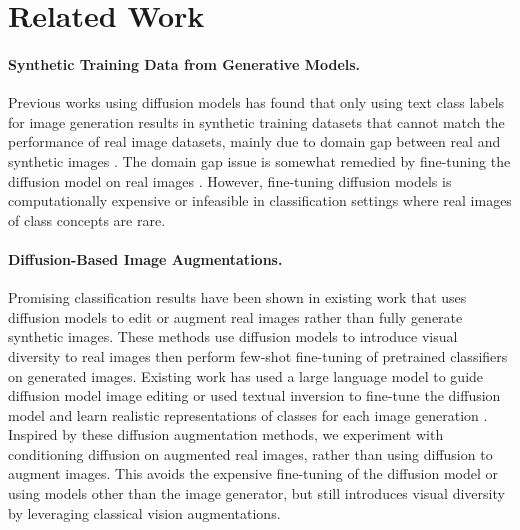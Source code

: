 \section{Related Work}

\vspace{-0.3cm}
\paragraph{Synthetic Training Data from Generative Models.}
Previous works using diffusion models has found that only using text class labels for image generation results in synthetic training datasets that cannot match the performance of real image datasets, mainly due to domain gap between real and synthetic images \citep{is_synthetic_data, fake_it}. 
The domain gap issue is somewhat remedied by fine-tuning the diffusion model on real images \citep{syntheticdataimagenet}. However, fine-tuning diffusion models is computationally expensive or infeasible in classification settings where real images of class concepts are rare.

\vspace{-0.3cm}
\paragraph{Diffusion-Based Image Augmentations.}
Promising classification results have been shown in existing work that uses diffusion models to edit or augment real images rather than fully generate synthetic images. 
These methods use diffusion models to introduce visual diversity to real images then perform few-shot fine-tuning of pretrained classifiers on generated images. 
Existing work has used a large language model to guide diffusion model image editing \cite{diversify} or used textual inversion \cite{text_inversion} to fine-tune the diffusion model and learn realistic representations of classes for each image generation \citep{da-fusion}. 
Inspired by these diffusion augmentation methods, we experiment with conditioning diffusion on augmented real images, rather than using diffusion to augment images. 
This avoids the expensive fine-tuning of the diffusion model or using models other than the image generator, but still introduces visual diversity by leveraging classical vision augmentations. 

